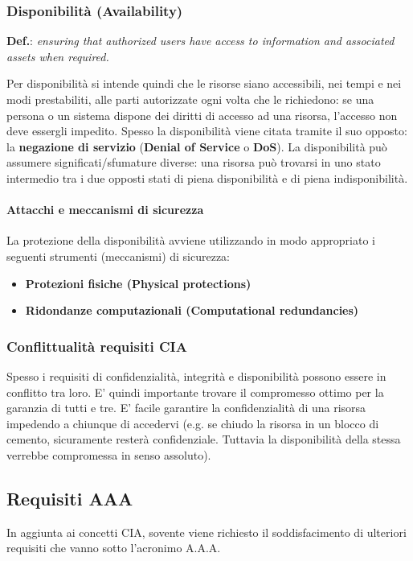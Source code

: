 \subsubsection{Disponibilità (Availability)}
\textbf{Def.}:\textit{ ensuring that authorized users have access to information and associated assets when required.} \newline

Per disponibilità si intende quindi che le risorse siano accessibili, nei tempi e nei modi prestabiliti, alle parti autorizzate ogni volta che le richiedono: se una persona o un sistema dispone dei diritti di accesso ad una risorsa, l'accesso non deve essergli impedito. Spesso la disponibilità viene citata tramite il suo opposto: la \textbf{negazione di servizio} (\textbf{Denial of Service} o \textbf{DoS}). La disponibilità può assumere significati/sfumature diverse: una risorsa può trovarsi in uno stato intermedio tra i due opposti stati di piena disponibilità e di piena indisponibilità.

\paragraph{Attacchi e meccanismi di sicurezza}
La protezione della disponibilità avviene utilizzando in modo appropriato i seguenti strumenti (meccanismi) di sicurezza:
\begin{itemize}
	\item \textbf{Protezioni fisiche (Physical protections)}
	\item \textbf{Ridondanze computazionali (Computational redundancies)}
\end{itemize} 

\subsubsection{Conflittualità requisiti CIA}
Spesso i requisiti di confidenzialità, integrità e disponibilità possono essere in conflitto tra loro. E' quindi importante trovare il compromesso ottimo per la garanzia di tutti e tre. E' facile garantire la confidenzialità di una risorsa impedendo a chiunque di accedervi (e.g. se chiudo la risorsa in un blocco di cemento, sicuramente resterà confidenziale. Tuttavia la disponibilità della stessa verrebbe compromessa in senso assoluto).

\subsection{Requisiti AAA}
In aggiunta ai concetti CIA, sovente viene richiesto il soddisfacimento di ulteriori requisiti che vanno sotto l'acronimo A.A.A.

